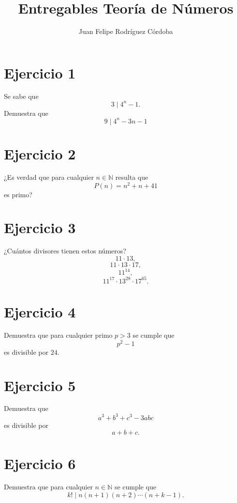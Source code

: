 \documentclass[12pt]{article}
\title{Entregables Teoría de Números}
\author{Juan Felipe Rodríguez Córdoba}
\date{}
\begin{document}
\maketitle

\section*{Ejercicio 1}
Se sabe que
\[
3 \mid 4^n - 1.
\]
Demuestra que
\[
9 \mid 4^n - 3n - 1
\]

\vspace{8cm}

\section*{Ejercicio 2}
¿Es verdad que para cualquier \(n \in \mathbb{N}\) resulta que
\[
P(n)=n^2+n+41
\]
es primo?

\vspace{5cm}

\section*{Ejercicio 3}
¿Cuántos divisores tienen estos números?
\[
11\cdot 13,
\]
\[
11\cdot 13\cdot 17,
\]
\[
11^{14},
\]
\[
11^{17}\cdot 13^{28}\cdot 17^{65}.
\]

\vspace{8cm}

\section*{Ejercicio 4}
Demuestra que para cualquier primo \(p>3\) se cumple que
\[
p^2-1
\]
es divisible por \(24\).

\vspace{5cm}

\section*{Ejercicio 5}
Demuestra que
\[
a^3+b^3+c^3-3abc
\]
es divisible por
\[
a+b+c.
\]

\vspace{7cm}

\section*{Ejercicio 6}
Demuestra que para cualquier \(n\in\mathbb{N}\) se cumple que
\[
k! \mid n(n+1)(n+2)\cdots(n+k-1).
\]

\vspace{7cm}
\end{document}
